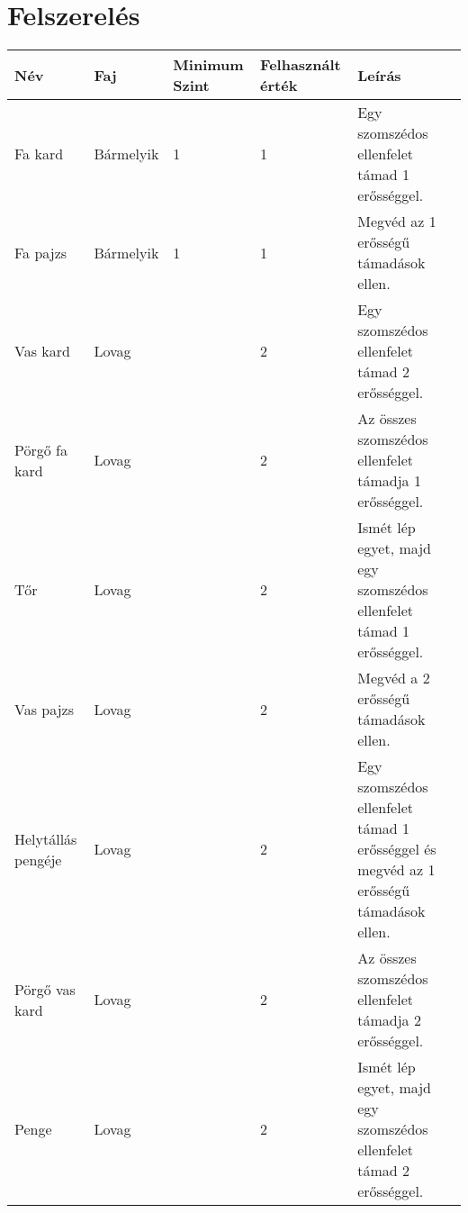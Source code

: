 \section{Felszerelés}
{\renewcommand{\arraystretch}{1.3}%

\begin{longtabu} to \textwidth {X[2l]|X[1.5l]|X[1.2c]|X[1.3c]|X[5l]}
	Név           & Faj     & Minimum Szint & Felhasznált érték & Leírás                                                                 \\ \hline \hline \endhead
	Fa kard       & Bármelyik & 1             & 1                 & Egy szomszédos ellenfelet támad 1 erősséggel.                          \\ \hline
	Fa pajzs      & Bármelyik & 1             & 1                 & Megvéd az 1 erősségű támadások ellen.                                  \\ \hline
	Vas kard      & Lovag     &               & 2                 & Egy szomszédos ellenfelet támad 2 erősséggel.                          \\ \hline
	Pörgő fa kard & Lovag     &               & 2                 & Az összes szomszédos ellenfelet támadja 1 erősséggel.                  \\ \hline
	Tőr           & Lovag     &               & 2                 & Ismét lép egyet, majd egy szomszédos ellenfelet támad 1 erősséggel. \\ \hline
	Vas pajzs& Lovag          &               & 2                  &  Megvéd a 2 erősségű támadások ellen.                                                                  \\ \hline
	Helytállás pengéje& Lovag          &               &  2                 & Egy szomszédos ellenfelet támad 1 erősséggel és megvéd az 1 erősségű támadások ellen.                                                                        \\ \hline
	Pörgő vas kard&  Lovag         &               &   2                &  Az összes szomszédos ellenfelet támadja 2 erősséggel.                                                                       \\ \hline
	Penge & Lovag          &               &  2                 &    Ismét lép egyet, majd egy szomszédos ellenfelet támad 2 erősséggel.                                                                     \\ \hline

\end{longtabu}}
